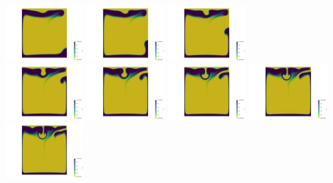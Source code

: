\begin{itemize}
\begin{center}
\includegraphics[width=3cm]{images/benchmark_vaks97/aspect/lvl7/composition0007}
\includegraphics[width=3cm]{images/benchmark_vaks97/aspect/lvl7/composition0008}
\includegraphics[width=3cm]{images/benchmark_vaks97/aspect/lvl7/composition0009}\\
\includegraphics[width=3cm]{images/benchmark_vaks97/aspect/lvl7/composition0010}
\includegraphics[width=3cm]{images/benchmark_vaks97/aspect/lvl7/composition0011}
\includegraphics[width=3cm]{images/benchmark_vaks97/aspect/lvl7/composition0012}
\includegraphics[width=3cm]{images/benchmark_vaks97/aspect/lvl7/composition0013}
\includegraphics[width=3cm]{images/benchmark_vaks97/aspect/lvl7/composition0014}\\

\end{center}
\end{itemize}
